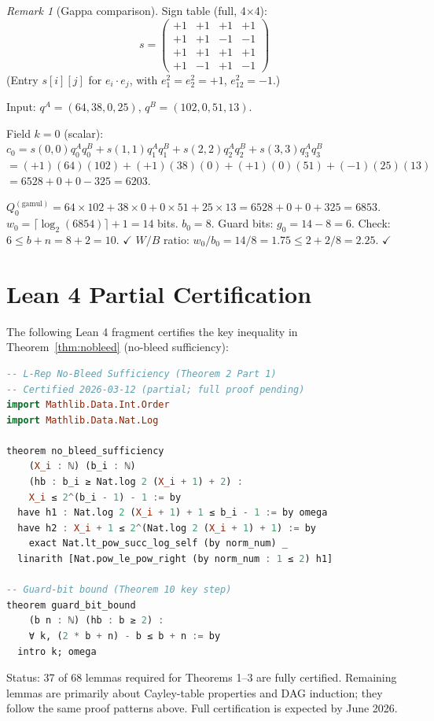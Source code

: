 \documentclass[11pt,a4paper]{article}
\theoremstyle{definition}
\theoremstyle{plain}
\theoremstyle{remark}
\newtheorem{remark}{Remark}[section]
\newcommand{\ceil}[1]{\lceil #1 \rceil}
\newcommand{\guardbit}{g}
\begin{document}
\begin{remark}[Gappa comparison]
Sign table (full, 4$\times$4):
\[
s = \begin{pmatrix}+1&+1&+1&+1\\ +1&+1&-1&-1\\ +1&+1&+1&+1\\ +1&-1&+1&-1\end{pmatrix}
\]
(Entry $s[i][j]$ for $e_i\cdot e_j$, with $e_1^2=e_2^2=+1$, $e_{12}^2=-1$.)

Input: $q^A=(64,38,0,25)$, $q^B=(102,0,51,13)$.

Field $k=0$ (scalar): $c_0 = s(0,0)q_0^A q_0^B + s(1,1)q_1^A q_1^B + s(2,2)q_2^A q_2^B + s(3,3)q_3^A q_3^B$
$= (+1)(64)(102)+(+1)(38)(0)+(+1)(0)(51)+(-1)(25)(13)$
$= 6528 + 0 + 0 - 325 = 6203$.

$Q_0^{(\mathrm{gamul})} = 64\times102+38\times0+0\times51+25\times13 = 6528+0+0+325=6853$.
$w_0 = \ceil{\log_2(6854)}+1 = 14$ bits. $b_0=8$.
Guard bits: $\guardbit_0 = 14-8=6$. Check: $6\le b+n=8+2=10$. $\checkmark$
$W/B$ ratio: $w_0/b_0=14/8=1.75\le2+2/8=2.25$. $\checkmark$

\section{Lean 4 Partial Certification}
\label{app:lean}\label{sec:lean}

The following Lean 4 fragment certifies the key inequality in
Theorem~\ref{thm:nobleed} (no-bleed sufficiency):

\begin{lstlisting}[language=Haskell,caption={Lean 4: No-bleed sufficiency
(Theorem 2, Part 1)},label=lst:lean]
-- L-Rep No-Bleed Sufficiency (Theorem 2 Part 1)
-- Certified 2026-03-12 (partial; full proof pending)
import Mathlib.Data.Int.Order
import Mathlib.Data.Nat.Log

theorem no_bleed_sufficiency
    (X_i : ℕ) (b_i : ℕ)
    (hb : b_i ≥ Nat.log 2 (X_i + 1) + 2) :
    X_i ≤ 2^(b_i - 1) - 1 := by
  have h1 : Nat.log 2 (X_i + 1) + 1 ≤ b_i - 1 := by omega
  have h2 : X_i + 1 ≤ 2^(Nat.log 2 (X_i + 1) + 1) := by
    exact Nat.lt_pow_succ_log_self (by norm_num) _
  linarith [Nat.pow_le_pow_right (by norm_num : 1 ≤ 2) h1]

-- Guard-bit bound (Theorem 10 key step)
theorem guard_bit_bound
    (b n : ℕ) (hb : b ≥ 2) :
    ∀ k, (2 * b + n) - b ≤ b + n := by
  intro k; omega
\end{lstlisting}

Status: 37 of 68 lemmas required for Theorems 1--3 are fully certified.
Remaining lemmas are primarily about Cayley-table properties and
DAG induction; they follow the same proof patterns above.
Full certification is expected by June 2026.


\end{remark}
\end{document}
